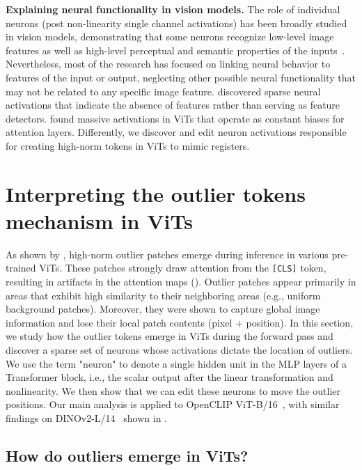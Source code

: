\documentclass{article}
\begin{document}
\textbf{Explaining neural functionality in vision models.} The role of individual neurons (post non-linearity single channel activations) has been broadly studied in vision models, demonstrating that some neurons recognize low-level image features as well as high-level perceptual and semantic properties of the inputs~\citep{schwettmann2023multimodal,8099837,hernandez2021natural,gandelsman2024interpretingsecondordereffectsneurons,dravid2023rosetta}. Nevertheless, most of the research has focused on linking neural behavior to features of the input or output, neglecting other possible neural functionality that may not be related to any specific image feature. \cite{robinson2024sparse} discovered sparse neural activations that indicate the absence of features rather than serving as feature detectors. \cite{sunmassive} found massive activations in ViTs that operate as constant biases for attention layers. Differently, we discover and edit neuron activations responsible for creating high-norm tokens in ViTs to mimic registers. 

\section{Interpreting the outlier tokens mechanism in ViTs}
\label{sec:interpret_outliers}
As shown by \cite{darcet2024vision}, high-norm outlier patches emerge during inference in various pre-trained ViTs.  These patches strongly draw attention from the \texttt{[CLS]} token, resulting in artifacts in the attention maps (). Outlier patches appear primarily in areas that exhibit high similarity to their neighboring areas (e.g., uniform background patches). Moreover, they were shown to capture global image information and lose their local patch contents (pixel + position). In this section, we study how the outlier tokens emerge in ViTs during the forward pass and discover a sparse set of neurons whose activations dictate the location of outliers. We use the term "neuron" to denote a single hidden unit in the MLP layers of a Transformer block, i.e., the scalar output after the linear transformation and nonlinearity. We then show that we can edit these neurons to move the outlier positions. Our main analysis is applied to OpenCLIP ViT-B/16~\citep{openclip}, with similar findings on DINOv2-L/14~\citep{dinov2} shown in .





\subsection{How do outliers emerge in ViTs?}
\label{subsec:outlier_investigation}
\end{document}

